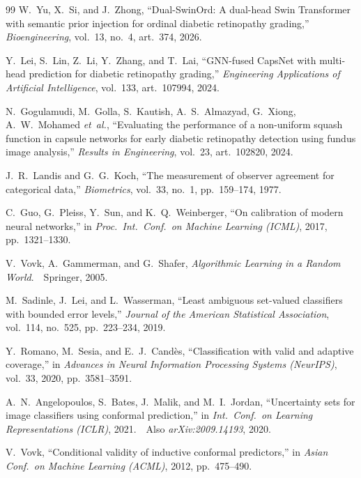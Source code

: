 \documentclass[journal]{IEEEtran}
\begin{document}
\begin{thebibliography}{99}
    W.~Yu, X.~Si, and J.~Zhong, ``Dual-SwinOrd: A dual-head Swin Transformer with semantic prior injection for ordinal diabetic retinopathy grading,'' \emph{Bioengineering}, vol.\ 13, no.\ 4, art.\ 374, 2026.

    Y.~Lei, S.~Lin, Z.~Li, Y.~Zhang, and T.~Lai, ``GNN-fused CapsNet with multi-head prediction for diabetic retinopathy grading,'' \emph{Engineering Applications of Artificial Intelligence}, vol.\ 133, art.\ 107994, 2024.

    N.~Gogulamudi, M.~Golla, S.~Kautish, A.~S.\ Almazyad, G.~Xiong, A.~W.\ Mohamed \emph{et~al.}, ``Evaluating the performance of a non-uniform squash function in capsule networks for early diabetic retinopathy detection using fundus image analysis,'' \emph{Results in Engineering}, vol.\ 23, art.\ 102820, 2024.





    J.~R.\ Landis and G.~G.\ Koch, ``The measurement of observer agreement for categorical data,'' \emph{Biometrics}, vol.\ 33, no.\ 1, pp.\ 159--174, 1977.

    C.~Guo, G.~Pleiss, Y.~Sun, and K.~Q.\ Weinberger, ``On calibration of modern neural networks,'' in \emph{Proc.\ Int.\ Conf.\ on Machine Learning (ICML)}, 2017, pp.\ 1321--1330.

    V.~Vovk, A.~Gammerman, and G.~Shafer, \emph{Algorithmic Learning in a Random World}.\ \ Springer, 2005.


    M.~Sadinle, J.~Lei, and L.~Wasserman, ``Least ambiguous set-valued classifiers with bounded error levels,'' \emph{Journal of the American Statistical Association}, vol.\ 114, no.\ 525, pp.\ 223--234, 2019.

    Y.~Romano, M.~Sesia, and E.~J.\ Cand\`es, ``Classification with valid and adaptive coverage,'' in \emph{Advances in Neural Information Processing Systems (NeurIPS)}, vol.\ 33, 2020, pp.\ 3581--3591.

    A.~N.\ Angelopoulos, S.~Bates, J.~Malik, and M.~I.\ Jordan, ``Uncertainty sets for image classifiers using conformal prediction,'' in \emph{Int.\ Conf.\ on Learning Representations (ICLR)}, 2021.\ \ Also \emph{arXiv:2009.14193}, 2020.

    V.~Vovk, ``Conditional validity of inductive conformal predictors,'' in \emph{Asian Conf.\ on Machine Learning (ACML)}, 2012, pp.\ 475--490.


\end{thebibliography}
\end{document}
